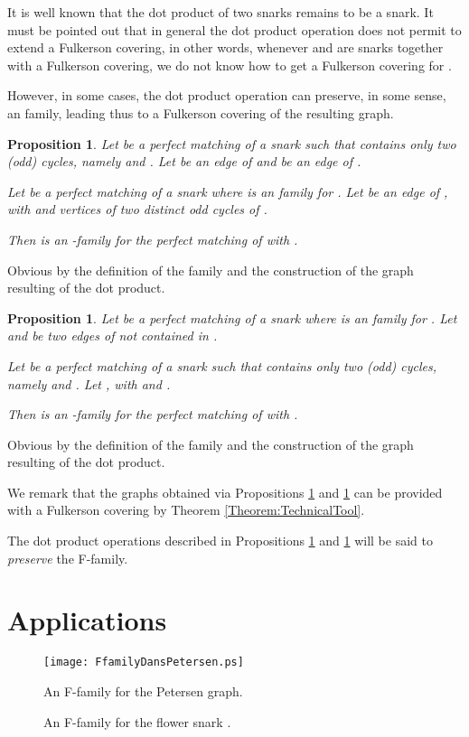 \documentclass{amsart}
\newtheorem{prop}[thm]{Proposition}
\theoremstyle{definition}
\theoremstyle{remark}
\newenvironment{prf}{{\bf \noindent Proof } }{\hfill\\}
\begin{document}
It is well known that the dot product of two snarks remains to be a
snark. It must be pointed out that in general the dot product
operation does not permit to extend a Fulkerson covering, in other
words, whenever  and  are snarks together with a Fulkerson
covering, we do not know how to get a Fulkerson covering for .


However, in some cases, the dot product operation can preserve, in
some sense, an family, leading thus to a Fulkerson covering of the
resulting graph.
\begin{prop}\label{Proposition:DotProduct_1}
Let  be a perfect matching of a snark  such that
 contains only two (odd) cycles, namely  and
.  Let  be an edge of  and  be an edge of .

Let   be a perfect matching of a snark  where   is an family for .
Let  be an edge of , with  and   vertices of two distinct odd cycles of
.

Then  is an -family for the perfect matching  of
 with .
\end{prop}
\begin{prf}
Obvious by the definition of the family and the  construction of
the graph resulting of the dot product.
\end{prf}
\begin{prop}\label{Proposition:DotProduct_2}
Let   be a perfect matching of a snark  where   is an family for .
Let  and  be two edges of   not
contained in .

Let  be a perfect matching of a snark  such that
 contains only two (odd) cycles, namely  and
. Let , with  and .


Then  is an -family for the perfect matching  of
 with .
\end{prop}
\begin{prf}
Obvious by the definition of the family and the  construction of
the graph resulting of the dot product.
\end{prf}

We remark that the graphs obtained via Propositions
\ref{Proposition:DotProduct_1} and \ref{Proposition:DotProduct_2}
can be provided with a Fulkerson covering by Theorem
\ref{Theorem:TechnicalTool}. 

The dot product operations described in Propositions \ref{Proposition:DotProduct_1} and \ref{Proposition:DotProduct_2} will be said to {\em preserve} the F-family.

\section{Applications}
\begin{figure}
\texttt{[image: FfamilyDansPetersen.ps]}
 \caption{An F-family  for the Petersen graph.} \label{Fig:FfamilyDansPetersen}
\end{figure}
\begin{figure}

  \caption{An F-family  for the flower snark .} 
\label{Fig:FfamilyDansJk}
\end{figure}
\end{document}
